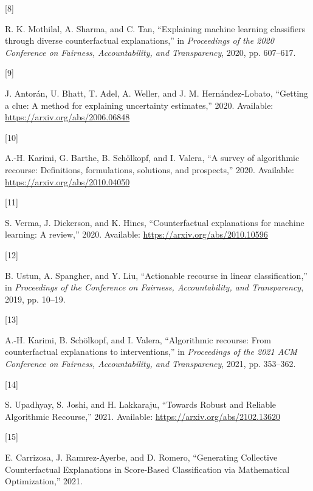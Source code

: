 \documentclass[conference,final,]{IEEEtran}
\newlength{\cslhangindent}
\newlength{\csllabelwidth}
\newlength{\cslentryspacingunit} %
\newenvironment{CSLReferences}[2] %
 {%
  \setlength{\parindent}{0pt}
  \ifodd #1
  \let\oldpar\par
  \def\par{\hangindent=\cslhangindent\oldpar}
  \fi
  \setlength{\parskip}{#2\cslentryspacingunit}
 }%
 {}
\newcommand{\CSLLeftMargin}[1]{\parbox[t]{\csllabelwidth}{#1}}
\newcommand{\CSLRightInline}[1]{\parbox[t]{\linewidth - \csllabelwidth}{#1}\break}
\theoremstyle{definition}
\theoremstyle{definition}
\theoremstyle{definition}
\theoremstyle{definition}
\theoremstyle{remark}
\begin{document}
\begin{CSLReferences}{0}{0}
\leavevmode{}%
\CSLLeftMargin{{[}8{]} }%
\CSLRightInline{R. K. Mothilal, A. Sharma, and C. Tan, {``Explaining machine learning classifiers through diverse counterfactual explanations,''} in \emph{Proceedings of the 2020 {Conference} on {Fairness}, {Accountability}, and {Transparency}}, 2020, pp. 607--617.}

\leavevmode{}%
\CSLLeftMargin{{[}9{]} }%
\CSLRightInline{J. Antorán, U. Bhatt, T. Adel, A. Weller, and J. M. Hernández-Lobato, {``Getting a clue: {A} method for explaining uncertainty estimates,''} 2020. Available: \url{https://arxiv.org/abs/2006.06848}}

\leavevmode{}%
\CSLLeftMargin{{[}10{]} }%
\CSLRightInline{A.-H. Karimi, G. Barthe, B. Schölkopf, and I. Valera, {``A survey of algorithmic recourse: {Definitions}, formulations, solutions, and prospects,''} 2020. Available: \url{https://arxiv.org/abs/2010.04050}}

\leavevmode{}%
\CSLLeftMargin{{[}11{]} }%
\CSLRightInline{S. Verma, J. Dickerson, and K. Hines, {``Counterfactual explanations for machine learning: {A} review,''} 2020. Available: \url{https://arxiv.org/abs/2010.10596}}

\leavevmode{}%
\CSLLeftMargin{{[}12{]} }%
\CSLRightInline{B. Ustun, A. Spangher, and Y. Liu, {``Actionable recourse in linear classification,''} in \emph{Proceedings of the {Conference} on {Fairness}, {Accountability}, and {Transparency}}, 2019, pp. 10--19.}

\leavevmode{}%
\CSLLeftMargin{{[}13{]} }%
\CSLRightInline{A.-H. Karimi, B. Schölkopf, and I. Valera, {``Algorithmic recourse: {From} counterfactual explanations to interventions,''} in \emph{Proceedings of the 2021 {ACM Conference} on {Fairness}, {Accountability}, and {Transparency}}, 2021, pp. 353--362.}

\leavevmode{}%
\CSLLeftMargin{{[}14{]} }%
\CSLRightInline{S. Upadhyay, S. Joshi, and H. Lakkaraju, {``Towards {Robust} and {Reliable Algorithmic Recourse},''} 2021. Available: \url{https://arxiv.org/abs/2102.13620}}

\leavevmode{}%
\CSLLeftMargin{{[}15{]} }%
\CSLRightInline{E. Carrizosa, J. Ramırez-Ayerbe, and D. Romero, {``Generating {Collective Counterfactual Explanations} in {Score-Based Classification} via {Mathematical Optimization},''} 2021.}


\end{CSLReferences}
\end{document}
